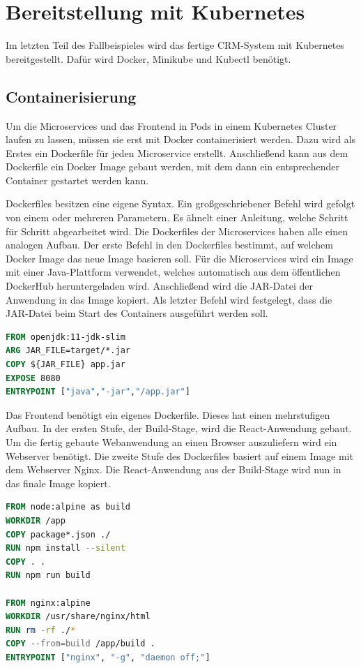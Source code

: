 \clearpage
\section{Bereitstellung mit Kubernetes}

Im letzten Teil des Fallbeispieles wird das fertige \ac{CRM}-System mit Kubernetes bereitgestellt. Dafür wird Docker, Minikube und Kubectl benötigt.

\subsection{Containerisierung}

Um die Microservices und das Frontend in Pods in einem Kubernetes Cluster laufen zu lassen, müssen sie erst mit Docker containerisiert werden. Dazu wird als Erstes ein Dockerfile für jeden Microservice erstellt. Anschließend kann aus dem Dockerfile ein Docker Image gebaut werden, mit dem dann ein entsprechender Container gestartet werden kann.

Dockerfiles besitzen eine eigene Syntax. Ein großgeschriebener Befehl wird gefolgt von einem oder mehreren Parametern. Es ähnelt einer Anleitung, welche Schritt für Schritt abgearbeitet wird. Die Dockerfiles der Microservices haben alle einen analogen Aufbau. Der erste Befehl in den Dockerfiles bestimmt, auf welchem Docker Image das neue Image basieren soll. Für die Microservices wird ein Image mit einer Java-Plattform verwendet, welches automatisch aus dem öffentlichen DockerHub heruntergeladen wird. Anschließend wird die \acs{JAR}-Datei der Anwendung in das Image kopiert. Als letzter Befehl wird festgelegt, dass die \acs{JAR}-Datei beim Start des Containers ausgeführt werden soll.

\begin{lstlisting}[language=dockerfile, caption=Dockerfile für den Kontakt-Microservice]
FROM openjdk:11-jdk-slim
ARG JAR_FILE=target/*.jar
COPY ${JAR_FILE} app.jar
EXPOSE 8080
ENTRYPOINT ["java","-jar","/app.jar"]
\end{lstlisting}

Das Frontend benötigt ein eigenes Dockerfile. Dieses hat einen mehrstufigen Aufbau. In der ersten Stufe, der Build-Stage, wird die React-Anwendung gebaut. Um die fertig gebaute Webanwendung an einen Browser auszuliefern wird ein Webserver benötigt. Die zweite Stufe des Dockerfiles basiert auf einem Image mit dem Webserver Nginx. Die React-Anwendung aus der Build-Stage wird nun in das finale Image kopiert.

\begin{lstlisting}[language=dockerfile, caption=Dockerfile für das Frontend]
FROM node:alpine as build
WORKDIR /app
COPY package*.json ./
RUN npm install --silent
COPY . .
RUN npm run build

FROM nginx:alpine
WORKDIR /usr/share/nginx/html
RUN rm -rf ./*
COPY --from=build /app/build .
ENTRYPOINT ["nginx", "-g", "daemon off;"]
\end{lstlisting}

